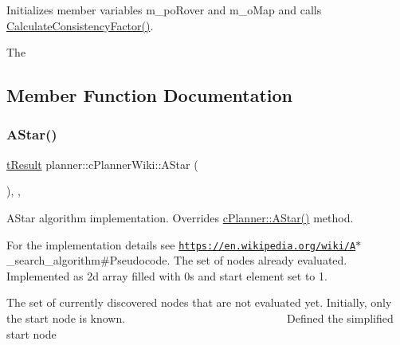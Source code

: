 Initializes member variables m\+\_\+po\+Rover and m\+\_\+o\+Map and calls \mbox{\hyperlink{classplanner_1_1c_planner_a2e5a745f83f903662eff914d8beddb5e}{Calculate\+Consistency\+Factor()}}. 

The 

\subsection{Member Function Documentation}
\mbox{\label{classplanner_1_1c_planner_wiki_a2652cf0e84d0a1fcd17e6c4288179955}} 
\subsubsection{\texorpdfstring{A\+Star()}{AStar()}}
{\footnotesize\ttfamily \mbox{\hyperlink{structt_result}{t\+Result}} planner\+::c\+Planner\+Wiki\+::\+A\+Star (\begin{DoxyParamCaption}{ }\end{DoxyParamCaption})\hspace{0.3cm}{\ttfamily [override]}, {\ttfamily [protected]}, {\ttfamily [virtual]}}



A\+Star algorithm implementation. Overrides \mbox{\hyperlink{classplanner_1_1c_planner_a341e70531266f023ac9461d18979d1ef}{c\+Planner\+::\+A\+Star()}} method. 

For the implementation details see \href{https://en.wikipedia.org/wiki/A}{\tt https\+://en.\+wikipedia.\+org/wiki/A}$\ast$\+\_\+search\+\_\+algorithm\#\+Pseudocode. The set of nodes already evaluated. Implemented as 2d array filled with 0s and start element set to 1.

The set of currently discovered nodes that are not evaluated yet. Initially, only the start node is known. ~\newline
~\newline
~\newline
~\newline
~\newline
~\newline
~\newline
~\newline
~\newline
~\newline
~\newline
~\newline
~\newline
~\newline
~\newline
~\newline
~\newline
 Defined the simplified start node

